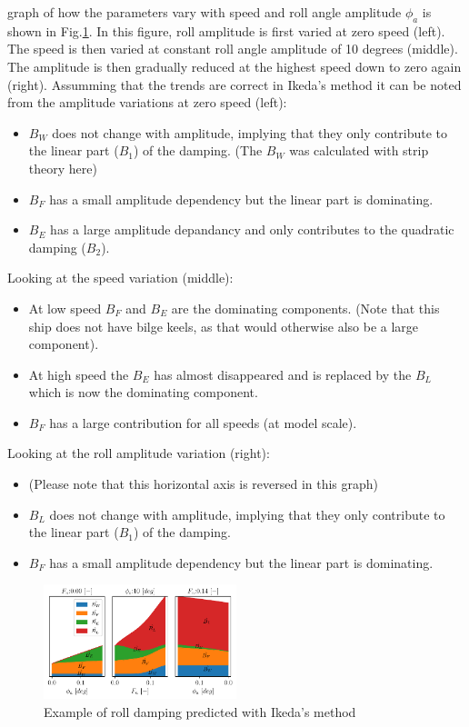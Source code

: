 graph of how the parameters vary with speed and roll angle amplitude
$\phi_a$ is shown in Fig.\ref{fig:ikeda_generic}. In this
figure, roll amplitude is first varied at zero speed (left). The speed
is then varied at constant roll angle amplitude of 10 degrees (middle).
The amplitude is then gradually reduced at the highest speed down to
zero again (right).
\quad Assumming that the trends are correct in Ikeda's method it can be
noted from the amplitude variations at zero speed (left):
\begin{itemize}
\item $B_W$ does not change with amplitude, implying that they only contribute to the linear part ($B_1$) of the damping. (The $B_W$ was calculated with strip theory here)
\item $B_F$ has a small amplitude dependency but the linear part is dominating.
\item $B_E$ has a large amplitude depandancy and only contributes to the quadratic damping ($B_2$)\citep{7505983/4AFVVGNT}.
\end{itemize}
\quad Looking at the speed variation (middle):
\begin{itemize}
\item At low speed $B_F$ and $B_E$ are the dominating components. (Note that this ship does not have bilge keels, as that would otherwise also be a large component).
\item At high speed the $B_E$ has almost disappeared and is replaced by the $B_L$ which is now the dominating component.
\item $B_F$ has a large contribution for all speeds (at model scale).
\end{itemize}
\quad Looking at the roll amplitude variation (right):
\begin{itemize}
\item (Please note that this horizontal axis is reversed in this graph)
\item $B_L$ does not change with amplitude, implying that they only contribute to the linear part ($B_1$) of the damping.
\item $B_F$ has a small amplitude dependency but the linear part is dominating.
\end{itemize}
\begin{figure}[H]
\begin{center}\includegraphics[width = 0.5\textwidth]{figures/ikeda_generic.pdf}\end{center}
\vspace{-1cm}
\caption{Example of roll damping predicted with Ikeda's method}
\label{fig:ikeda_generic}
\end{figure}
